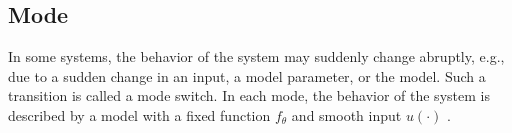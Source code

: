 \subsection{Mode}
\label{sec:mode}

In some systems, the behavior of the system may suddenly change abruptly, e.g., due to a sudden change in an input, a model parameter, or the model. Such a transition is called a mode switch.
In each mode, the behavior of the system is described by a model with a fixed function $f_{\theta}$ and smooth input $u(\cdot)$ \autocite{deschutter2000optimal}.


